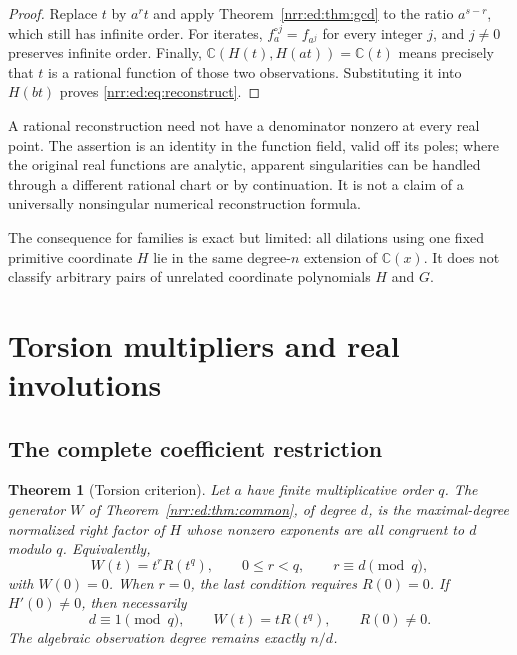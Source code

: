 \documentclass[11pt,letterpaper]{article}
\newtheorem{theorem}{Theorem}[section]
\theoremstyle{definition}
\theoremstyle{remark}
\newcommand{\C}{\mathbb C}
\begin{document}
\begin{proof}
Replace $t$ by $a^rt$ and apply Theorem~\ref{nrr:ed:thm:gcd} to the ratio $a^{s-r}$,
which still has infinite order. For iterates, $f_a^{\circ j}=f_{a^j}$ for every
integer $j$, and $j\ne0$ preserves infinite order. Finally,
$\C(H(t),H(at))=\C(t)$ means precisely that $t$ is a rational function of those
two observations. Substituting it into $H(bt)$ proves \eqref{nrr:ed:eq:reconstruct}.
\end{proof}

A rational reconstruction need not have a denominator nonzero at every real
point. The assertion is an identity in the function field, valid off its poles;
where the original real functions are analytic, apparent singularities can be
handled through a different rational chart or by continuation. It is not a claim
of a universally nonsingular numerical reconstruction formula.

The consequence for families is exact but limited: all dilations using one fixed
primitive coordinate $H$ lie in the same degree-$n$ extension of $\C(x)$. It does
not classify arbitrary pairs of unrelated coordinate polynomials $H$ and $G$.

\section{Torsion multipliers and real involutions}
\label{nrr:ed:sec:torsion}

\subsection{The complete coefficient restriction}

\begin{theorem}[Torsion criterion]
\label{nrr:ed:thm:torsion}
Let $a$ have finite multiplicative order $q$. The generator $W$ of
Theorem~\ref{nrr:ed:thm:common}, of degree $d$, is the maximal-degree normalized right
factor of $H$ whose nonzero exponents are all congruent to $d$ modulo $q$.
Equivalently,
\begin{equation}
 W(t)=t^rR(t^q),\qquad 0\le r<q,\qquad r\equiv d\pmod q,
 \label{nrr:ed:eq:torsion-form}
\end{equation}
with $W(0)=0$. When $r=0$, the last condition requires $R(0)=0$.
If $H'(0)\ne0$, then necessarily
\begin{equation}
 d\equiv1\pmod q,\qquad W(t)=tR(t^q),\qquad R(0)\ne0.
 \label{nrr:ed:eq:torsion-linear}
\end{equation}
The algebraic observation degree remains exactly $n/d$.
\end{theorem}
\end{document}
